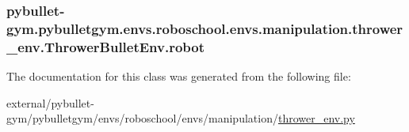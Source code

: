 \subsubsection[{\texorpdfstring{robot}{robot}}]{\setlength{\rightskip}{0pt plus 5cm}pybullet-\/gym.\+pybulletgym.\+envs.\+roboschool.\+envs.\+manipulation.\+thrower\+\_\+env.\+Thrower\+Bullet\+Env.\+robot}\hypertarget{classpybullet-gym_1_1pybulletgym_1_1envs_1_1roboschool_1_1envs_1_1manipulation_1_1thrower__env_1_1_thrower_bullet_env_afd7d604a564dbfe4b72a49e2796af691}{}\label{classpybullet-gym_1_1pybulletgym_1_1envs_1_1roboschool_1_1envs_1_1manipulation_1_1thrower__env_1_1_thrower_bullet_env_afd7d604a564dbfe4b72a49e2796af691}


The documentation for this class was generated from the following file\+:\begin{DoxyCompactItemize}
\item 
external/pybullet-\/gym/pybulletgym/envs/roboschool/envs/manipulation/\hyperlink{roboschool_2envs_2manipulation_2thrower__env_8py}{thrower\+\_\+env.\+py}\end{DoxyCompactItemize}
